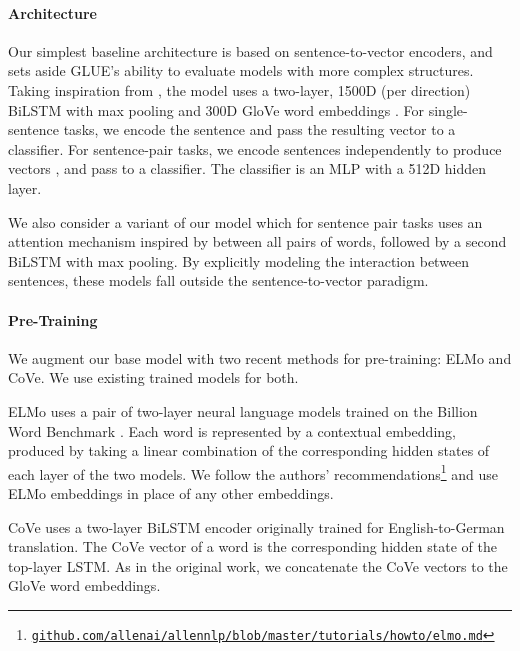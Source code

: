 \documentclass{article} \usepackage{iclr2019_conference,times}
\begin{document}
\paragraph{Architecture}

Our simplest baseline architecture is based on sentence-to-vector encoders, and sets aside GLUE's ability to evaluate models with more complex structures.
Taking inspiration from \citet{DBLP:conf/emnlp/ConneauKSBB17}, the model uses a two-layer, 1500D (per direction) BiLSTM with max pooling and 300D GloVe word embeddings \citep[840B Common Crawl version;][]{pennington2014glove}.
For single-sentence tasks, we encode the sentence and pass the resulting vector to a classifier.
For sentence-pair tasks, we encode sentences independently to produce vectors , and pass  to a classifier.
The classifier is an MLP with a 512D hidden layer.

We also consider a variant of our model which for sentence pair tasks uses an attention mechanism inspired by \citet{seo2016bidirectional} between all pairs of words, followed by a second BiLSTM with max pooling.
By explicitly modeling the interaction between sentences, these models fall outside the sentence-to-vector paradigm.

\paragraph{Pre-Training} We augment our base model with two recent methods for pre-training: ELMo and CoVe. 
We use existing trained models for both.

ELMo uses a pair of two-layer neural language models trained on the Billion Word Benchmark \citep{chelba2013one}. 
Each word is represented by a contextual embedding, produced by taking a linear combination of the corresponding hidden states of each layer of the two models. 
We follow the authors' recommendations\footnote{\href{https://github.com/allenai/allennlp/blob/master/tutorials/how_to/elmo.md}{\tt github.com/\allowbreak allenai/\allowbreak allennlp/\allowbreak blob/\allowbreak master/\allowbreak tutorials/\allowbreak how\textunderscore to/\allowbreak elmo.md}} and use ELMo embeddings in place of any other embeddings.

CoVe \citep{mccann2017learned} uses a two-layer BiLSTM encoder originally trained for English-to-German translation. 
The CoVe vector of a word is the corresponding hidden state of the top-layer LSTM. 
As in the original work, we concatenate the CoVe vectors to the GloVe word embeddings. 
\end{document}
